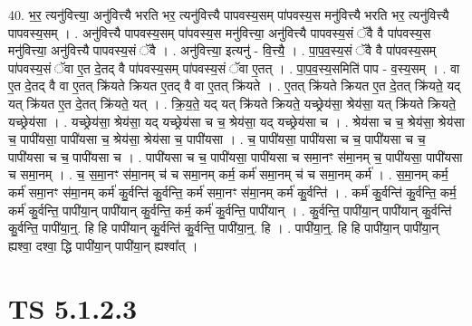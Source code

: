 \documentclass[17pt]{extarticle}
\begin{document}
40. भ॒र॒ त्यनु॑वित्त्या॒ अनु॑वित्त्यै भरति भर॒ त्यनु॑वित्त्यै पापवस्य॒सम् पा॑पवस्य॒स मनु॑वित्त्यै भरति भर॒ त्यनु॑वित्त्यै पापवस्य॒सम् । . अनु॑वित्त्यै पापवस्य॒सम् पा॑पवस्य॒स मनु॑वित्त्या॒ अनु॑वित्त्यै पापवस्य॒सं ॅवै वै पा॑पवस्य॒स मनु॑वित्त्या॒ अनु॑वित्त्यै पापवस्य॒सं ॅवै । . अनु॑वित्त्या॒ इत्यनु॑ - वि॒त्त्यै॒ । . पा॒प॒व॒स्य॒सं ॅवै वै पा॑पवस्य॒सम् पा॑पवस्य॒सं ॅवा ए॒त दे॒तद् वै पा॑पवस्य॒सम् पा॑पवस्य॒सं ॅवा ए॒तत् । . पा॒प॒व॒स्य॒समिति॑ पाप - व॒स्य॒सम् । . वा ए॒त दे॒तद् वै वा ए॒तत् क्रि॑यते क्रियत ए॒तद् वै वा ए॒तत् क्रि॑यते । . ए॒तत् क्रि॑यते क्रियत ए॒त दे॒तत् क्रि॑यते॒ यद् यत् क्रि॑यत ए॒त दे॒तत् क्रि॑यते॒ यत् । . क्रि॒य॒ते॒ यद् यत् क्रि॑यते क्रियते॒ यच्छ्रेय॑सा॒ श्रेय॑सा॒ यत् क्रि॑यते क्रियते॒ यच्छ्रेय॑सा । . यच्छ्रेय॑सा॒ श्रेय॑सा॒ यद् यच्छ्रेय॑सा च च॒ श्रेय॑सा॒ यद् यच्छ्रेय॑सा च । . श्रेय॑सा च च॒ श्रेय॑सा॒ श्रेय॑सा च॒ पापी॑यसा॒ पापी॑यसा च॒ श्रेय॑सा॒ श्रेय॑सा च॒ पापी॑यसा । . च॒ पापी॑यसा॒ पापी॑यसा च च॒ पापी॑यसा च च॒ पापी॑यसा च च॒ पापी॑यसा च । . पापी॑यसा च च॒ पापी॑यसा॒ पापी॑यसा च समा॒नꣳ स॑मा॒नम् च॒ पापी॑यसा॒ पापी॑यसा च समा॒नम् । . च॒ स॒मा॒नꣳ स॑मा॒नम् च॑ च समा॒नम् कर्म॒ कर्म॑ समा॒नम् च॑ च समा॒नम् कर्म॑ । . स॒मा॒नम् कर्म॒ कर्म॑ समा॒नꣳ स॑मा॒नम् कर्म॑ कु॒र्वन्ति॑ कु॒र्वन्ति॒ कर्म॑ समा॒नꣳ स॑मा॒नम् कर्म॑ कु॒र्वन्ति॑ । . कर्म॑ कु॒र्वन्ति॑ कु॒र्वन्ति॒ कर्म॒ कर्म॑ कु॒र्वन्ति॒ पापी॑या॒न् पापी॑यान् कु॒र्वन्ति॒ कर्म॒ कर्म॑ कु॒र्वन्ति॒ पापी॑यान् । . कु॒र्वन्ति॒ पापी॑या॒न् पापी॑यान् कु॒र्वन्ति॑ कु॒र्वन्ति॒ पापी॑या॒न्॒. हि हि पापी॑यान् कु॒र्वन्ति॑ कु॒र्वन्ति॒ पापी॑या॒न्॒. हि । . पापी॑या॒न्॒. हि हि पापी॑या॒न् पापी॑या॒न् ह्यश्वा॒ दश्वा॒ द्धि पापी॑या॒न् पापी॑या॒न् ह्यश्वा᳚त् । \newline
\pagebreak
{}

\section{ TS 5.1.2.3 }
\end{document}
